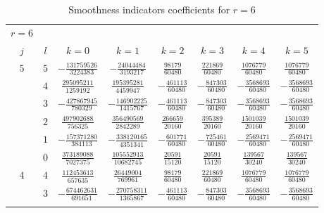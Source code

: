 \begin{table}
  \begin{center}
    \caption{Smoothness indicators coefficients for $r=6$}
    \label{tab:IS_6}
    \begin{tabular}{cccccccc}
      \toprule
      $r=6$  \\
      $j$  &  $l$  &  $k=0$                           &  $k=1$                           &  $k=2$                  &  $k=3$                        &  $k=4$                      &  $k=5$                      \\ \addlinespace
      $5$  &  $5$  &  $-\frac{ 131759526}{ 3224383}$  &  $-\frac{  24044484}{ 3193217}$  &  $ \frac{  98179}{60480}$  &  $ \frac{ 221869}{60480}$  &  $ \frac{ 1076779}{60480}$  &  $ \frac{ 1076779}{60480}$  \\ \addlinespace
           &  $4$  &  $ \frac{ 295095211}{ 1259192}$  &  $ \frac{ 195395281}{ 4459947}$  &  $-\frac{ 461113}{60480}$  &  $-\frac{ 847303}{60480}$  &  $-\frac{ 3568693}{60480}$  &  $-\frac{ 3568693}{60480}$  \\ \addlinespace
           &  $3$  &  $-\frac{ 427867945}{  780329}$  &  $-\frac{ 146902225}{ 1415767}$  &  $-\frac{ 461113}{60480}$  &  $-\frac{ 847303}{60480}$  &  $-\frac{ 3568693}{60480}$  &  $-\frac{ 3568693}{60480}$  \\ \addlinespace
           &  $2$  &  $ \frac{ 497902688}{  756325}$  &  $ \frac{ 356490569}{ 2842289}$  &  $ \frac{ 266659}{20160}$  &  $ \frac{ 395389}{20160}$  &  $ \frac{ 1501039}{20160}$  &  $ \frac{ 1501039}{20160}$  \\ \addlinespace
           &  $1$  &  $-\frac{ 157371280}{  384113}$  &  $-\frac{ 338120165}{ 4351341}$  &  $-\frac{ 601771}{60480}$  &  $-\frac{ 725461}{60480}$  &  $-\frac{ 2569471}{60480}$  &  $-\frac{ 2569471}{60480}$  \\ \addlinespace
           &  $0$  &  $ \frac{ 373189088}{ 7027375}$  &  $ \frac{ 105552913}{10682745}$  &  $ \frac{  20591}{15120}$  &  $ \frac{  20591}{15120}$  &  $ \frac{  139567}{30240}$  &  $ \frac{  139567}{30240}$  \\ \addlinespace
      $4$  &  $4$  &  $ \frac{ 112453613}{  657635}$  &  $ \frac{  26449004}{  769961}$  &  $ \frac{  98179}{60480}$  &  $ \frac{ 221869}{60480}$  &  $ \frac{ 1076779}{60480}$  &  $ \frac{ 1076779}{60480}$  \\ \addlinespace
           &  $3$  &  $-\frac{ 674462631}{  691651}$  &  $-\frac{ 270758311}{ 1365867}$  &  $-\frac{ 461113}{60480}$  &  $-\frac{ 847303}{60480}$  &  $-\frac{ 3568693}{60480}$  &  $-\frac{ 3568693}{60480}$  \\ \addlinespace

\end{tabular}
\end{center}
\end{table}
